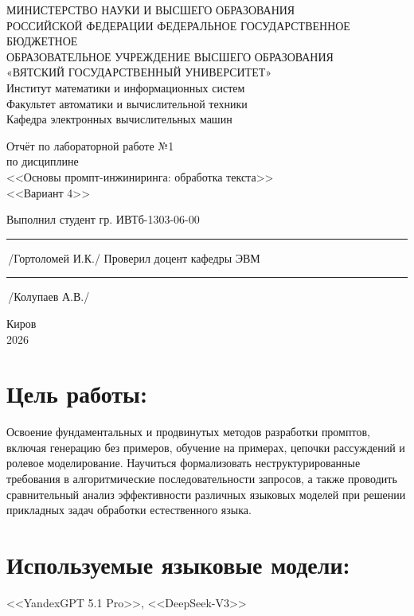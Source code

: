 \documentclass[oneside,a4paper,14pt]{extarticle} %
\begin{document}
	\newpage\thispagestyle{empty}
	\begin{center}
		МИНИСТЕРСТВО НАУКИ И ВЫСШЕГО ОБРАЗОВАНИЯ\\
			РОССИЙСКОЙ ФЕДЕРАЦИИ
			ФЕДЕРАЛЬНОЕ ГОСУДАРСТВЕННОЕ БЮДЖЕТНОЕ\\
			ОБРАЗОВАТЕЛЬНОЕ
			УЧРЕЖДЕНИЕ ВЫСШЕГО ОБРАЗОВАНИЯ\\
			«ВЯТСКИЙ ГОСУДАРСТВЕННЫЙ УНИВЕРСИТЕТ»\\
			Институт математики и информационных систем\\
			Факультет автоматики и вычислительной техники\\
			Кафедра электронных вычислительных машин
	\end{center}
	\vspace{20mm}

	\begin{center}
		Отчёт по лабораторной работе №1\\
		по дисциплине\\
		<<Основы промпт-инжиниринга: обработка текста>>\\
		<<Вариант 4>>\\
	\end{center}
	\vspace{48mm}

	\noindent
	Выполнил студент гр. ИВТб-1303-06-00 \hfill \rule[-0,5mm]{30mm}{0.15mm}\,/Гортоломей И.К./
	\newline
	Проверил доцент кафедры ЭВМ \hfill \rule[-0,5mm]{30mm}{0.15mm}\,/Колупаев А.В./

	\vfill
	\begin{center}
		Киров\\
		2026
	\end{center}

	\newpage
	\thispagestyle{empty}

	\section*{Цель работы:} Освоение фундаментальных и продвинутых методов разработки промптов, включая генерацию без примеров, обучение на примерах, цепочки рассуждений и ролевое моделирование. Научиться формализовать неструктурированные требования в алгоритмические последовательности запросов, а также проводить сравнительный анализ эффективности различных языковых моделей при решении прикладных задач обработки естественного языка.
	\section*{Используемые языковые модели:} <<YandexGPT 5.1 Pro>>, <<DeepSeek-V3>>
	
	\newpage
	
	
	
	
	\newpage
	
	\newpage
	
\end{document}
